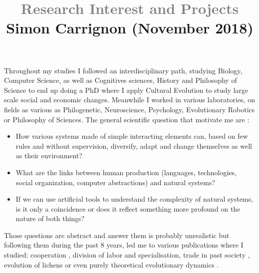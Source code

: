 \documentclass[10pt]{article}
\title{\textcolor{grey}{\Large Research Interest and Projects}\\
\vspace{-.25cm}
{ \normalsize Simon Carrignon (November 2018)}}
\author{}
\date{}
\begin{document}
\maketitle

\vspace{-.5cm}

Throughout my studies I followed an interdisciplinary path, studying Biology, Computer Science, as well as Cognitives sciences, History and Philosophy of Science to end up doing a PhD where I apply Cultural Evolution to study large scale social and economic changes. Meanwhile I worked  in various laboratories, on fields as various as Philogenetic, Neuroscience, Psychology, Evolutionary Robotics or Philosophy of Sciences. The general scientific question that motivate me are : 
\begin{itemize}
    \item How various systems made of simple interacting elements can, based on few rules and without supervision, diversify, adapt and change themselves as well as their environment?
    \item What are the links between human production (languages, technologies, social organization, computer abstractions) and natural systems? 
    \item If we can use artificial tools to understand the complexity of natural systems, is it only a coincidence or does it reflect something more profound on the nature of both things?
\end{itemize}
Those questions are abstract and answer them is probably unrealistic but following them during the past 8 years, led me to various publications where I studied: cooperation \cite{zibetti2015acaciaesanagentbasedmodelingandsimulationtoolforinvestigatingsocialbehaviorsinresourcelimitedtwodimensionalenvironments}, division of labor and specialisation\cite{montanier2016behavioralspecializationinembodiedevolutionaryroboticswhysodifficult,bredeche2017benefitsofproportionateselectioninembodiedevolutionacasestudywithbehaviouralspecialization}, trade in past society \cite{carrignon2015modelingthecoevolutionoftradeandcultureinpastsocieties}, evolution of lichens \cite{carrignon2016lichen} or even purely theoretical evolutionary dynamics \cite{medernach2015evolutionary,medernach2016evolution}.
\end{document}
